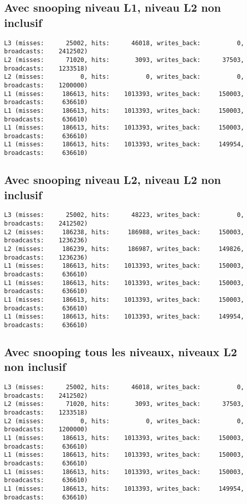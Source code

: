 \documentclass{article}
\begin{document}
{\subsection*{Avec snooping niveau L1, niveau L2 non inclusif}
\begin{verbatim}
L3 (misses:      25002, hits:      46018, writes_back:          0, broadcasts:    2412502)
L2 (misses:      71020, hits:       3093, writes_back:      37503, broadcasts:    1233518)
L2 (misses:          0, hits:          0, writes_back:          0, broadcasts:    1200000)
L1 (misses:     186613, hits:    1013393, writes_back:     150003, broadcasts:     636610)
L1 (misses:     186613, hits:    1013393, writes_back:     150003, broadcasts:     636610)
L1 (misses:     186613, hits:    1013393, writes_back:     150003, broadcasts:     636610)
L1 (misses:     186613, hits:    1013393, writes_back:     149954, broadcasts:     636610)
\end{verbatim}

\newpage
\subsection*{Avec snooping niveau L2, niveau L2 non inclusif}
\begin{verbatim}
L3 (misses:      25002, hits:      48223, writes_back:          0, broadcasts:    2412502)
L2 (misses:     186238, hits:     186988, writes_back:     150003, broadcasts:    1236236)
L2 (misses:     186239, hits:     186987, writes_back:     149826, broadcasts:    1236236)
L1 (misses:     186613, hits:    1013393, writes_back:     150003, broadcasts:     636610)
L1 (misses:     186613, hits:    1013393, writes_back:     150003, broadcasts:     636610)
L1 (misses:     186613, hits:    1013393, writes_back:     150003, broadcasts:     636610)
L1 (misses:     186613, hits:    1013393, writes_back:     149954, broadcasts:     636610)
\end{verbatim}

\subsection*{Avec snooping tous les niveaux, niveaux L2 non inclusif}
\begin{verbatim}
L3 (misses:      25002, hits:      46018, writes_back:          0, broadcasts:    2412502)
L2 (misses:      71020, hits:       3093, writes_back:      37503, broadcasts:    1233518)
L2 (misses:          0, hits:          0, writes_back:          0, broadcasts:    1200000)
L1 (misses:     186613, hits:    1013393, writes_back:     150003, broadcasts:     636610)
L1 (misses:     186613, hits:    1013393, writes_back:     150003, broadcasts:     636610)
L1 (misses:     186613, hits:    1013393, writes_back:     150003, broadcasts:     636610)
L1 (misses:     186613, hits:    1013393, writes_back:     149954, broadcasts:     636610)
\end{verbatim}

}
\end{document}
